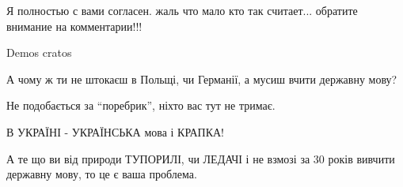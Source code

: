 \begin{itemize}
Я полностью с вами согласен. жаль что мало кто так считает... обратите внимание на комментарии!!!


Demos cratos


А чому ж ти не штокаєш в Польщі, чи Германії, а мусиш вчити державну мову?

Не подобається за \enquote{поребрик}, ніхто вас тут не тримає.

В УКРАЇНІ - УКРАЇНСЬКА мова і КРАПКА!

А те що ви від природи ТУПОРИЛІ, чи ЛЕДАЧІ і не взмозі за 30 років вивчити
державну мову, то це є ваша проблема.

\end{itemize}

